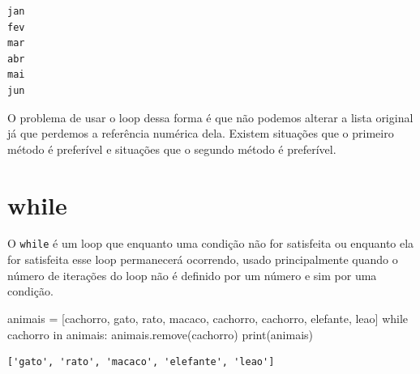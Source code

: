 \documentclass[
  letterpaper,
  DIV=11,
  numbers=noendperiod]{scrreprt}
\newenvironment{Shaded}{\begin{snugshade}}{\end{snugshade}}
\newcommand{\BuiltInTok}[1]{\textcolor[rgb]{0.00,0.23,0.31}{#1}}
\newcommand{\ControlFlowTok}[1]{\textcolor[rgb]{0.00,0.23,0.31}{#1}}
\newcommand{\KeywordTok}[1]{\textcolor[rgb]{0.00,0.23,0.31}{#1}}
\newcommand{\NormalTok}[1]{\textcolor[rgb]{0.00,0.23,0.31}{#1}}
\newcommand{\OperatorTok}[1]{\textcolor[rgb]{0.37,0.37,0.37}{#1}}
\newcommand{\StringTok}[1]{\textcolor[rgb]{0.13,0.47,0.30}{#1}}
\begin{document}
\begin{tcolorbox}[enhanced jigsaw, breakable, leftrule=.75mm, left=2mm, opacityback=0, bottomrule=.15mm, toprule=.15mm, rightrule=.15mm, arc=.35mm, colback=white]

\begin{verbatim}
jan
fev
mar
abr
mai
jun
\end{verbatim}

\end{tcolorbox}

O problema de usar o loop dessa forma é que não podemos alterar a lista
original já que perdemos a referência numérica dela. Existem situações
que o primeiro método é preferível e situações que o segundo método é
preferível.

\hypertarget{while}{%
\section{while}\label{while}}

O \texttt{while} é um loop que enquanto uma condição não for satisfeita
ou enquanto ela for satisfeita esse loop permanecerá ocorrendo, usado
principalmente quando o número de iterações do loop não é definido por
um número e sim por uma condição.

\begin{Shaded}
\begin{Highlighting}[]
\NormalTok{animais }\OperatorTok{=}\NormalTok{ [}\StringTok{\textquotesingle{}cachorro\textquotesingle{}}\NormalTok{, }\StringTok{\textquotesingle{}gato\textquotesingle{}}\NormalTok{, }\StringTok{\textquotesingle{}rato\textquotesingle{}}\NormalTok{, }\StringTok{\textquotesingle{}macaco\textquotesingle{}}\NormalTok{, }\StringTok{\textquotesingle{}cachorro\textquotesingle{}}\NormalTok{, }\StringTok{\textquotesingle{}cachorro\textquotesingle{}}\NormalTok{, }\StringTok{\textquotesingle{}elefante\textquotesingle{}}\NormalTok{, }\StringTok{\textquotesingle{}leao\textquotesingle{}}\NormalTok{]}
\ControlFlowTok{while} \StringTok{\textquotesingle{}cachorro\textquotesingle{}} \KeywordTok{in}\NormalTok{ animais:}
\NormalTok{    animais.remove(}\StringTok{\textquotesingle{}cachorro\textquotesingle{}}\NormalTok{)}
\BuiltInTok{print}\NormalTok{(animais)}
\end{Highlighting}
\end{Shaded}

\begin{tcolorbox}[enhanced jigsaw, breakable, leftrule=.75mm, left=2mm, opacityback=0, bottomrule=.15mm, toprule=.15mm, rightrule=.15mm, arc=.35mm, colback=white]

\begin{verbatim}
['gato', 'rato', 'macaco', 'elefante', 'leao']
\end{verbatim}

\end{tcolorbox}
\end{document}
